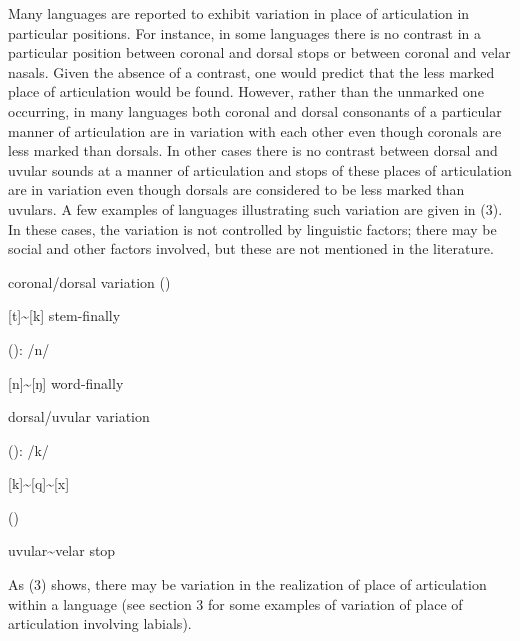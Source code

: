 \documentclass[output=paper]{langsci/langscibook}
\begin{document}
  Many languages are reported to exhibit variation in place of articulation in particular positions. For instance, in some languages there is no contrast in a particular position between coronal and dorsal stops or between coronal and velar nasals. Given the absence of a contrast, one would predict that the less marked place of articulation would be found. However, rather than the unmarked one occurring, in many languages both coronal and dorsal consonants of a particular manner of articulation are in variation with each other even though coronals are less marked than dorsals. In other cases there is no contrast between dorsal and uvular sounds at a manner of articulation and stops of these places of articulation are in variation even though dorsals are considered to be less marked than uvulars. A few examples of languages illustrating such variation are given in (3). In these cases, the variation is not controlled by linguistic factors; there may be social and other factors involved, but these are not mentioned in the literature.

\ea%
    \label{ex:3}
   
    
\ea  coronal/dorsal variation
   () \citep{DeReuse2006}

\-\hspace{0.5cm}[t]{\textasciitilde}[k] stem-finally 

 (): /n/ \citep{Payne2013}

\-\hspace{0.5cm}[n]{\textasciitilde}[ŋ] word-finally 

\ex
  dorsal/uvular variation 

 (): /k/ \citep{Cowan1965}

\-\hspace{0.5cm}[k]{\textasciitilde}[q]{\textasciitilde}[x]

 () \citep{Maddieson2011}

\-\hspace{0.5cm}uvular{\textasciitilde}velar stop
\z
\z

As (3) shows, there may be variation in the realization of place of articulation within a language (see section 3 for some examples of variation of place of articulation involving labials). 
\end{document}
